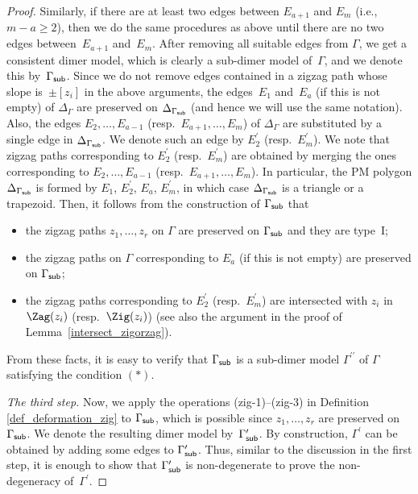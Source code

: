 \begin{proof}
Similarly, if there are at least two edges between $E_{a+1}$ and $E_m$ (i.e., $m-a \geq 2$), then we do the same procedures as above until there are no two edges between~$E_{a+1}$ and~$E_m$.
After removing all suitable edges from $\Gamma$, we get a consistent dimer model, which is clearly a sub-dimer model of~$\Gamma$,
and we denote this by~$\Gamma_{\sf sub}$.
Since we do not remove edges contained in a zigzag path whose slope is~$\pm[z_i]$ in the above arguments,
the edges~$E_1$ and~$E_a$ (if this is not empty) of $\Delta_\Gamma$ are preserved on $\Delta_{\Gamma_{\sf sub}}$ (and hence we will use the same notation).
Also, the edges $E_2,\dots,E_{a-1}$ (resp.~$E_{a+1},\dots,E_m$) of $\Delta_\Gamma$ are substituted by a single edge in $\Delta_{\Gamma_{\sf sub}}$.
We denote such an edge by $E_2^\prime$ (resp.~$E_m^\prime$).
We note that zigzag paths corresponding to $E_2^\prime$ (resp.~$E_m^\prime$) are obtained by merging the ones corresponding to $E_2,\dots,E_{a-1}$ (resp.~$E_{a+1},\dots,E_m$).
In particular, the PM polygon $\Delta_{\Gamma_{\sf sub}}$ is formed by $E_1$, $E_2^\prime$, $E_a$, $E_m^\prime$, in which case $\Delta_{\Gamma_{\sf sub}}$ is a triangle or a trapezoid.
Then, it follows from the construction of $\Gamma_{\sf sub}$ that
\begin{itemize}\itemsep=0pt
\item[--] the zigzag paths $z_1,\dots,z_r$ on $\Gamma$ are preserved on $\Gamma_{\sf sub}$ and they are type~I;
\item[--] the zigzag paths on $\Gamma$ corresponding to $E_a$ (if this is not empty) are preserved on $\Gamma_{\sf sub}$;
\item[--] the zigzag paths corresponding to $E_2^\prime$ (resp.~$E_m^\prime$) are intersected with $z_i$ in $\Zag(z_i)$ (resp.\ $\Zig(z_i)$)
(see also the argument in the proof of Lemma~\ref{intersect_zigorzag}).
\end{itemize}
From these facts, it is easy to verify that $\Gamma_{\sf sub}$ is a sub-dimer model $\Gamma^{\prime\prime}$ of $\Gamma$ satisfying the condition $(*)$.

{\it The third step.}
Now, we apply the operations (zig-1)--(zig-3) in Definition \ref{def_deformation_zig} to $\Gamma_{\sf sub}$,
which is possible since $z_1,\dots,z_r$ are preserved on~$\Gamma_{\sf sub}$.
We denote the resulting dimer model by~$\Gamma^\prime_{\sf sub}$.
By construction, $\Gamma^\prime$ can be obtained by adding some edges to $\Gamma^\prime_{\sf sub}$. Thus, similar to the discussion in the first step, it is enough to show that $\Gamma^\prime_{\sf sub}$ is non-degenerate to prove the non-degeneracy of~$\Gamma^\prime$.


\end{proof}

